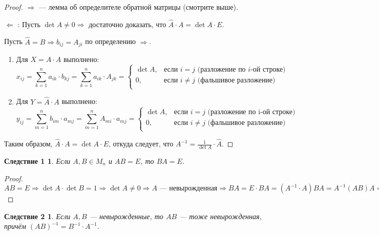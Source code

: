 \documentclass[a4paper, 12pt]{article}
\newtheorem*{que30cons1}{Следствие 1}
\newtheorem*{que30cons2}{Следствие 2}
\begin{document}
\begin{proof}
$\Rightarrow$ --- лемма об определителе обратной матрицы (смотрите выше).

$\Leftarrow$ : Пусть $\det A \neq 0 \Rightarrow$ достаточно доказать, что $\hat{A} \cdot A = \det A \cdot E$.

Пусть $\hat{A} = B \Rightarrow b_{ij} = A_{ji}$ по определению $\Rightarrow$.

\begin{enumerate}
  \item Для $X = A \cdot \hat{A}$ выполнено:
  $$
  x_{ij} = \sum_{k = 1}^{n} a_{ik} \cdot b_{kj} = \sum_{k = 1}^{n} a_{ik} \cdot A_{jk} = 
  \begin{cases}
  \det A, & \text{если $i = j$ (разложение по $i$-ой строке)}\\
  0, & \text{если $i \neq j$ (фальшивое разложение)}\\
  \end{cases}
  $$
  \item Для $Y = \hat{A} \cdot A$ выполнено:
  $$y_{ij} = \displaystyle\sum_{m = 1}^{n} b_{im} \cdot a_{mj} = \displaystyle\sum_{m = 1}^{n} A_{mi} \cdot a_{mj} = 
  \begin{cases}
  \det A, & \text{если $i = j$ (разложение по i-ой строке)}\\
  0, & \text{если $i \neq j$ (фальшивое разложение)}\\
  \end{cases}
  $$
\end{enumerate}

Таким образом, $\hat{A} \cdot A = \det A \cdot E$, откуда следует, что $A^{-1} = \frac{1}{\det A} \cdot \hat{A}$.
\end{proof}

\begin{que30cons1}
Если $A, B \in M_n$ и $AB = E$, то $BA = E$.
\end{que30cons1}

\begin{proof}
$
AB = E \Rightarrow \det A \cdot \det B = 1 \Rightarrow \det A \neq 0 \Rightarrow A \text{ — невырожденная} \Rightarrow BA = E \cdot BA = (A^{-1} \cdot A)BA = A^{-1}(AB)A = A^{-1} \cdot E \cdot A = E.
$
\end{proof}

\begin{que30cons2}
Если $A, B$ --- невырожденные, то $AB$ --- тоже невырожденная, причём $(AB)^{-1} = B^{-1} \cdot A^{-1}$.
\end{que30cons2}
\end{document}

